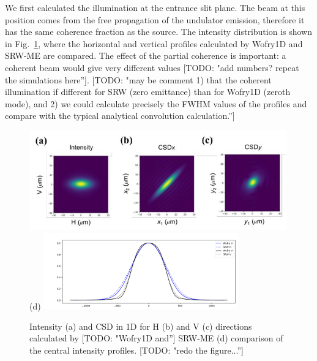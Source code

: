\documentclass{iucr}              %
\newcommand{\todo}[1]{{\color{red}[TODO: "#1'']}}
\begin{document}
We first calculated the illumination at the entrance slit plane. The beam at this position comes from the free propagation of the undulator emission, therefore it has the same coherence fraction as the source. The intensity distribution is shown in Fig.~\ref{fig:intensityat36m}, where the horizontal and vertical profiles calculated by Wofry1D and SRW-ME are compared. The effect of the partial coherence is important: a coherent beam would give very different values \todo{add numbers? repeat the simulations here}. \todo{may be comment 1) that the coherent illumination if different for SRW (zero emittance) than for Wofry1D (zeroth mode), and 2) we could calculate precisely the FWHM values of the profiles and compare with the typical analytical convolution calculation.}   

\begin{figure}
    \label{fig:intensityat36m}
    \includegraphics[width=0.99\textwidth]{figures/a-intensity-b-CSDx-and-c-CSDy-of-the-secondary-source_W640.jpg}
    (d) \includegraphics[width=0.75\textwidth]{figures/profiles_at_36m.png}
    \caption{Intensity (a) and CSD in 1D for H (b) and V (c) directions calculated by \todo{Wofry1D and} SRW-ME  (d) comparison of the central intensity profiles. \todo{redo the figure...}}
\end{figure}
\end{document}
